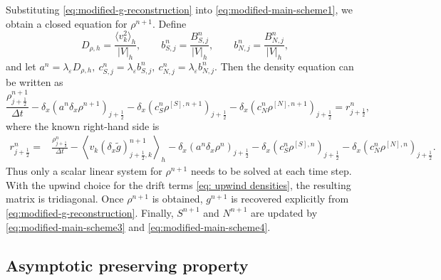 \documentclass[11pt,twoside]{article}
\numberwithin{equation}{section}
\theoremstyle{plain}
\theoremstyle{nonumberplain}
\begin{document}
{{Substituting \eqref{eq:modified-g-reconstruction} into  \eqref{eq:modified-main-scheme1}, we obtain a closed equation for
\(\rho^{n+1}\). Define
\[
D_{\rho,h}
=
\frac{\langle v_k^2\rangle_h}{|V|_h},
\qquad
b_{S,j}^n
=
\frac{B_{S,j}^n}{|V|_h},
\qquad
b_{N,j}^n
=
\frac{B_{N,j}^n}{|V|_h},
\]
and let
$
a^n=\lambda_\varepsilon D_{\rho,h},
\
c_{S,j}^n=\lambda_\varepsilon b_{S,j}^n,
\
c_{N,j}^n=\lambda_\varepsilon b_{N,j}^n.
$
Then the density equation can be written as
\begin{equation}\label{eq:modified-rho-equation-two-upwind}
\frac{\rho_{j+\frac12}^{n+1}}{\Delta t}
-
\delta_x\left(
a^n\delta_x\rho^{n+1}
\right)_{j+\frac12}
-
\delta_x\left(
c_S^n\rho^{[S],n+1}
\right)_{j+\frac12}
-
\delta_x\left(
c_N^n\rho^{[N],n+1}
\right)_{j+\frac12}
=
r_{j+\frac12}^n,
\end{equation}
where the known right-hand side is
\[
\begin{aligned}
r_{j+\frac12}^n
=&
\frac{\rho_{j+\frac12}^n}{\Delta t}
-
\left\langle
v_k(\delta_x\widetilde g)_{j+\frac12,k}^{n+1}
\right\rangle_h
-
\delta_x\left(
a^n\delta_x\rho^n
\right)_{j+\frac12}
-
\delta_x\left(
c_S^n\rho^{[S],n}
\right)_{j+\frac12}
-
\delta_x\left(
c_N^n\rho^{[N],n}
\right)_{j+\frac12}.
\end{aligned}
\]
Thus only a scalar linear system for \(\rho^{n+1}\) needs to be solved at
each time step. With the upwind choice for the drift terms \eqref{eq: upwind densities}, the
resulting matrix is tridiagonal. Once \(\rho^{n+1}\) is obtained,
\(g^{n+1}\) is recovered explicitly from
\eqref{eq:modified-g-reconstruction}. Finally, \(S^{n+1}\) and \(N^{n+1}\)
are updated by  \eqref{eq:modified-main-scheme3} and \eqref{eq:modified-main-scheme4}.


\subsection{Asymptotic preserving property}

}}
\end{document}
